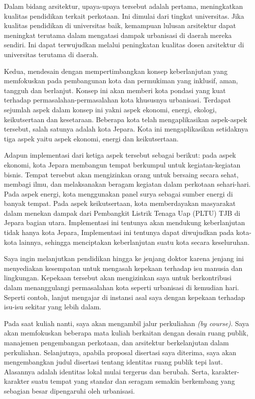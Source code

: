 \documentclass{article}
\begin{document}
Dalam bidang arsitektur, upaya-upaya tersebut adalah pertama, meningkatkan kualitas pendidikan terkait perkotaan. Ini dimulai dari tingkat universitas.
Jika kualitas pendidikan di universitas baik,  kemampuan lulusan arsitektur dapat meningkat terutama dalam mengatasi dampak urbanisasi di daerah mereka sendiri. Ini dapat terwujudkan melalui peningkatan kualitas dosen arsitektur di universitas terutama di daerah.

Kedua, mendesain dengan mempertimbangkan  konsep keberlanjutan yang memfokuskan pada pembangunan kota dan permukiman yang inklusif, aman, tangguh dan berlanjut.
Konsep ini akan memberi kota pondasi yang kuat terhadap permasalahan-permasalahan kota khususnya urbanisasi.
Terdapat sejumlah aspek dalam konsep ini yakni aspek ekonomi, energi, ekologi, keikutsertaan dan kesetaraan. Beberapa kota telah mengaplikasikan aspek-aspek tersebut, salah satunya adalah kota Jepara. Kota ini mengaplikasikan setidaknya tiga aspek yaitu aspek ekonomi, energi dan keikutsertaan.

Adapun implementasi dari ketiga aspek tersebut sebagai berikut: pada aspek ekonomi, kota Jepara membangun tempat berkumpul untuk kegiatan-kegiatan bisnis. Tempat tersebut akan mengizinkan orang untuk bersaing secara sehat, membagi ilmu, dan melaksanakan beragam kegiatan dalam perkotaan sehari-hari.
Pada aspek energi, kota menggunakan panel surya sebagai sumber energi di banyak tempat.
Pada aspek keikutsertaan, kota memberdayakan masyarakat dalam menekan dampak dari Pembangkit Listrik Tenaga Uap (PLTU) TJB di Jepara bagian utara.
Implementasi ini tentunya akan mendukung keberlanjutan tidak hanya kota Jepara,
Implementasi ini tentunya dapat diwujudkan pada kota-kota lainnya, sehingga menciptakan keberlanjutan suatu kota secara keseluruhan.

Saya ingin melanjutkan pendidikan hingga ke jenjang doktor karena jenjang ini menyediakan kesempatan untuk mengasah kepekaan terhadap isu manusia dan lingkungan.
Kepekaan tersebut akan mengizinkan saya untuk berkontribusi dalam menanggulangi permasalahan kota seperti urbanisasi di kemudian hari.
Seperti contoh, lanjut mengajar di instansi asal saya dengan kepekaan terhadap isu-isu sekitar yang lebih dalam.

Pada saat kuliah nanti, saya akan mengambil jalur perkuliahan \textit{(by course)}.
Saya akan memfokuskan beberapa mata kuliah berkaitan dengan desain ruang publik, manajemen pengembangan perkotaan, dan arsitektur berkelanjutan dalam perkuliahan.
Selanjutnya, apabila proposal disertasi saya diterima, saya akan mengembangkan judul disertasi tentang identitas ruang publik tepi laut.
Alasannya adalah identitas lokal mulai tergerus dan berubah.
Serta, karakter-karakter suatu tempat yang standar dan seragam semakin berkembang yang sebagian besar dipengaruhi oleh urbanisasi.
\end{document}
